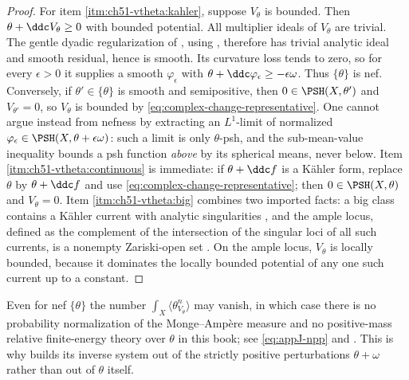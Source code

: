 \begin{proof}
For item \cref{itm:ch51-vtheta:kahler}, suppose $V_\theta$ is bounded.
Then $\theta+\ddc V_\theta\geq0$ with bounded potential.  All
multiplier ideals of $V_\theta$ are trivial.  The gentle dyadic
regularization of , using
\cite[Theorem~1.6.2]{XiaBook}, therefore has trivial analytic ideal and
smooth residual, hence is smooth.  Its curvature loss tends to zero, so
for every $\epsilon>0$ it supplies a smooth $\varphi_\epsilon$ with
$\theta+\ddc\varphi_\epsilon\geq-\epsilon\omega$.  Thus
$\{\theta\}$ is nef.  Conversely, if $\theta'\in\{\theta\}$ is smooth and
semipositive, then
$0\in\PSH(X,\theta')$ and $V_{\theta'}=0$, so $V_\theta$ is bounded by
\eqref{eq:complex-change-representative}.  One cannot argue instead from
nefness by extracting an $L^1$-limit of normalized
$\varphi_\epsilon\in\PSH(X,\theta+\epsilon\omega)$: such a limit is only
$\theta$-psh, and the sub-mean-value inequality bounds a psh function
\emph{above} by its spherical means, never below.  Item
\cref{itm:ch51-vtheta:continuous} is immediate: if
$\theta+\ddc f$ is a K\"ahler form, replace $\theta$ by
$\theta+\ddc f$ and use \eqref{eq:complex-change-representative}; then
$0\in\PSH(X,\theta)$ and $V_\theta=0$.  Item
\cref{itm:ch51-vtheta:big} combines two imported facts: a big class
contains a K\"ahler current with analytic singularities
\cite{Dem92reg,DPS01}, and the ample locus, defined as the complement of
the intersection of the singular loci of all such currents, is a nonempty
Zariski-open set \cite{Bou04}.  On the ample locus, $V_\theta$ is
locally bounded, because it dominates the locally bounded potential of any
one such current up to a constant.
\end{proof}

\par\noindent\begin{minipage}{\textwidth}
\begin{remark}
\label{rem:ch51-zero-volume}
Even for nef $\{\theta\}$ the number $\int_X\langle\theta_{V_\theta}^n
\rangle$ may vanish, in which case there is no probability
normalization of the Monge--Amp\`ere measure and no positive-mass relative
finite-energy theory over $\theta$ in this book; see \eqref{eq:appJ-npp} and
.  This is why
 builds its inverse system out
of the strictly positive perturbations $\theta+\omega$ rather than out of
$\theta$ itself.
\end{remark}
\end{minipage}\par\medskip


